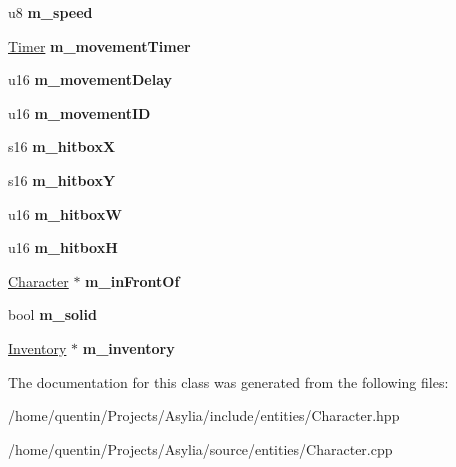 \begin{DoxyCompactItemize}
\item 
\hypertarget{classCharacter_ae6caee7127b57536e0e362f8a23eac28}{u8 {\bfseries m\-\_\-speed}}\label{classCharacter_ae6caee7127b57536e0e362f8a23eac28}

\item 
\hypertarget{classCharacter_adf5dd33b7cdbe035eb9d77df092cee2a}{\hyperlink{classTimer}{Timer} {\bfseries m\-\_\-movement\-Timer}}\label{classCharacter_adf5dd33b7cdbe035eb9d77df092cee2a}

\item 
\hypertarget{classCharacter_a285b29a73d9b053012834cb9203bf91d}{u16 {\bfseries m\-\_\-movement\-Delay}}\label{classCharacter_a285b29a73d9b053012834cb9203bf91d}

\item 
\hypertarget{classCharacter_a12dc3a908e7545bdd57b6a0be1026023}{u16 {\bfseries m\-\_\-movement\-I\-D}}\label{classCharacter_a12dc3a908e7545bdd57b6a0be1026023}

\item 
\hypertarget{classCharacter_a62f7fd4c06706d4a7784f0ccc2052fc3}{s16 {\bfseries m\-\_\-hitbox\-X}}\label{classCharacter_a62f7fd4c06706d4a7784f0ccc2052fc3}

\item 
\hypertarget{classCharacter_afe8b09372a17189d666f0b0ea95418da}{s16 {\bfseries m\-\_\-hitbox\-Y}}\label{classCharacter_afe8b09372a17189d666f0b0ea95418da}

\item 
\hypertarget{classCharacter_a65fcf1f2f6c9974fad46d8305d7a9b24}{u16 {\bfseries m\-\_\-hitbox\-W}}\label{classCharacter_a65fcf1f2f6c9974fad46d8305d7a9b24}

\item 
\hypertarget{classCharacter_a69d34ecd6f766d7bcdc109d23bd8fce5}{u16 {\bfseries m\-\_\-hitbox\-H}}\label{classCharacter_a69d34ecd6f766d7bcdc109d23bd8fce5}

\item 
\hypertarget{classCharacter_a7d6dabf9d5e52ae91ede388cfdbc6c4a}{\hyperlink{classCharacter}{Character} $\ast$ {\bfseries m\-\_\-in\-Front\-Of}}\label{classCharacter_a7d6dabf9d5e52ae91ede388cfdbc6c4a}

\item 
\hypertarget{classCharacter_aa923ad7ba7070a25d9722af12188ac7d}{bool {\bfseries m\-\_\-solid}}\label{classCharacter_aa923ad7ba7070a25d9722af12188ac7d}

\item 
\hypertarget{classCharacter_a7eed332ed6050decc2853332df574f4a}{\hyperlink{classInventory}{Inventory} $\ast$ {\bfseries m\-\_\-inventory}}\label{classCharacter_a7eed332ed6050decc2853332df574f4a}

\end{DoxyCompactItemize}


The documentation for this class was generated from the following files\-:\begin{DoxyCompactItemize}
\item 
/home/quentin/\-Projects/\-Asylia/include/entities/Character.\-hpp\item 
/home/quentin/\-Projects/\-Asylia/source/entities/Character.\-cpp\end{DoxyCompactItemize}

